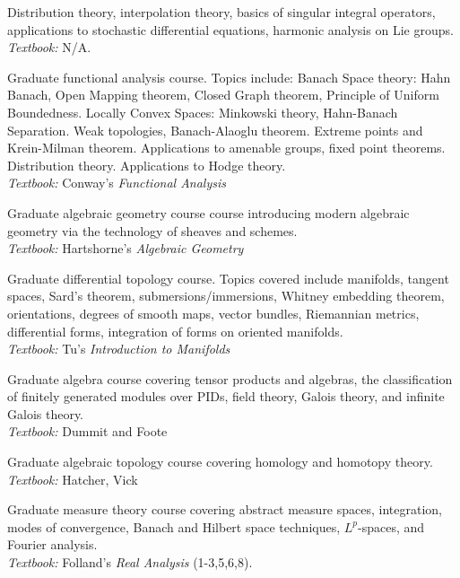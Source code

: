 \documentclass[11pt,letterpaper,sans]{moderncv}
\begin{document}
%
   {Distribution theory, interpolation theory, basics of singular integral operators, applications to stochastic differential equations, harmonic analysis on Lie groups.\\ \emph{Textbook: }N/A.}


%
  {Graduate functional analysis course. Topics include: Banach Space theory: Hahn Banach, Open Mapping theorem, Closed Graph theorem, Principle of Uniform Boundedness. Locally Convex Spaces: Minkowski theory, Hahn-Banach Separation. Weak topologies, Banach-Alaoglu theorem. Extreme points and Krein-Milman theorem. Applications to amenable groups, fixed point theorems. Distribution theory. Applications to Hodge theory.\\ \emph{Textbook: }Conway's \emph{Functional Analysis}}

%
  {Graduate algebraic geometry course course introducing modern algebraic geometry via the technology of sheaves and schemes.  \\ \emph{Textbook: }Hartshorne's \emph{Algebraic Geometry}}

%
  {Graduate differential topology course. Topics covered include manifolds, tangent spaces, Sard's theorem, submersions/immersions, Whitney embedding theorem, orientations, degrees of smooth maps, vector bundles, Riemannian metrics, differential forms, integration of forms on oriented manifolds. \\ \emph{Textbook: }Tu's \emph{Introduction to Manifolds}}

%
  {Graduate algebra course covering tensor products and algebras, the classification of finitely generated modules over PIDs, field theory, Galois theory, and infinite Galois theory.  \\ \emph{Textbook: }Dummit and Foote}

%
  {Graduate algebraic topology course covering homology and homotopy theory.  \\ \emph{Textbook: }Hatcher, Vick}

%
  {Graduate measure theory course covering abstract measure spaces, integration, modes of convergence, Banach and Hilbert space techniques, $L^p$-spaces, and Fourier analysis. \\ \emph{Textbook: }Folland's \emph{Real Analysis} (1-3,5,6,8).}
\end{document}

